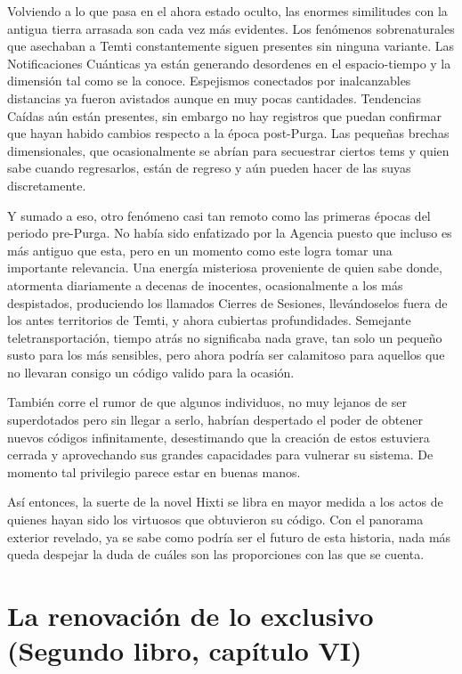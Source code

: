 \documentclass[
  spanish,
]{book}
\begin{document}
Volviendo a lo que pasa en el ahora estado oculto, las enormes similitudes con la antigua tierra arrasada son cada vez más evidentes. Los fenómenos sobrenaturales que asechaban a Temti constantemente siguen presentes sin ninguna variante. Las Notificaciones Cuánticas ya están generando desordenes en el espacio-tiempo y la dimensión tal como se la conoce. Espejismos conectados por inalcanzables distancias ya fueron avistados aunque en muy pocas cantidades. Tendencias Caídas aún están presentes, sin embargo no hay registros que puedan confirmar que hayan habido cambios respecto a la época post-Purga. Las pequeñas brechas dimensionales, que ocasionalmente se abrían para secuestrar ciertos tems y quien sabe cuando regresarlos, están de regreso y aún pueden hacer de las suyas discretamente.

Y sumado a eso, otro fenómeno casi tan remoto como las primeras épocas del periodo pre-Purga. No había sido enfatizado por la Agencia puesto que incluso es más antiguo que esta, pero en un momento como este logra tomar una importante relevancia. Una energía misteriosa proveniente de quien sabe donde, atormenta diariamente a decenas de inocentes, ocasionalmente a los más despistados, produciendo los llamados Cierres de Sesiones, llevándoselos fuera de los antes territorios de Temti, y ahora cubiertas profundidades. Semejante teletransportación, tiempo atrás no significaba nada grave, tan solo un pequeño susto para los más sensibles, pero ahora podría ser calamitoso para aquellos que no llevaran consigo un código valido para la ocasión.

También corre el rumor de que algunos individuos, no muy lejanos de ser superdotados pero sin llegar a serlo, habrían despertado el poder de obtener nuevos códigos infinitamente, desestimando que la creación de estos estuviera cerrada y aprovechando sus grandes capacidades para vulnerar su sistema. De momento tal privilegio parece estar en buenas manos.

Así entonces, la suerte de la novel Hixti se libra en mayor medida a los actos de quienes hayan sido los virtuosos que obtuvieron su código. Con el panorama exterior revelado, ya se sabe como podría ser el futuro de esta historia, nada más queda despejar la duda de cuáles son las proporciones con las que se cuenta.

\hypertarget{la-renovaciuxf3n-de-lo-exclusivo-segundo-libro-capuxedtulo-vi}{%
\section{La renovación de lo exclusivo (Segundo libro, capítulo VI)}\label{la-renovaciuxf3n-de-lo-exclusivo-segundo-libro-capuxedtulo-vi}}
\end{document}
